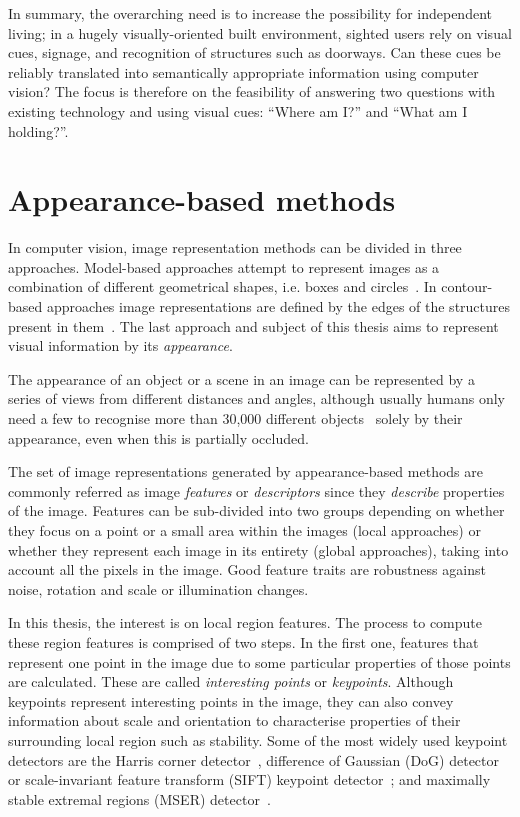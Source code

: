 In summary, the overarching need is to increase the possibility for independent living; in a hugely visually-oriented built environment, sighted users rely on visual cues, signage, and recognition of structures such as doorways.  Can these cues be reliably translated into semantically appropriate information using computer vision? The focus is therefore on the feasibility of answering two questions with existing technology and using visual cues: ``Where am I?'' and ``What am I holding?''. 


\section{Appearance-based methods}

In computer vision, image representation methods can be divided in three approaches. Model-based approaches attempt to represent images as a combination of different geometrical shapes, i.e. boxes and circles~\cite{biederman1987}. In contour-based approaches image representations are defined by the edges of the structures present in them~\cite{canny1986computational}. The last approach and subject of this thesis aims to represent visual information by its \textit{appearance}. 

The appearance of an object or a scene in an image can be represented by a series of views from different distances and angles, although usually humans only need a few to recognise more than 30,000 different objects~\cite{biederman1987recognition} solely by their appearance, even when this is partially occluded. 

The set of image representations generated by appearance-based methods are commonly referred as image \textit{features} or \textit{descriptors} since they \textit{describe} properties of the image. Features can be sub-divided into two groups depending on whether they focus on a point or a small area within the images (local approaches) or whether they represent each image in its entirety (global approaches), taking into account all the pixels in the image. Good feature traits are robustness against noise, rotation and scale or illumination changes. 

In this thesis, the interest is on local region features. The process to compute these region features is comprised of two steps. In the first one, features that represent one point in the image due to some particular properties of those points are calculated. These are called \textit{interesting points} or \textit{keypoints}. Although keypoints represent interesting points in the image, they can also convey information about scale and orientation to characterise properties of their surrounding local region such as stability. Some of the most widely used keypoint detectors are the Harris corner detector~\cite{harris1988combined}, difference of Gaussian (DoG) detector or scale-invariant feature transform (SIFT) keypoint detector~\cite{lowe2004distinctive}; and maximally stable extremal regions (MSER) detector~\cite{matas2004robust}.

